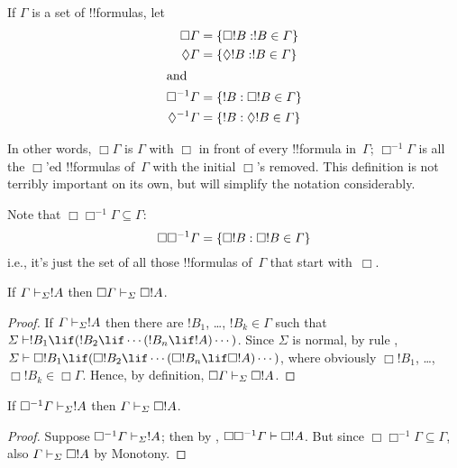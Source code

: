 \documentclass[../../../include/open-logic-section]{subfiles}
\begin{document}
\begin{defn}
  If $\Gamma$ is a set of !!{formula}s, let
  \begin{align*}
    \Box\Gamma & = \Setabs{\Box !B}{!B \in \Gamma}\\
    \Diamond\Gamma & = \Setabs{\Diamond !B}{!B \in \Gamma}\\
    \intertext{and}
    \Box^{-1}\Gamma & = \Setabs{!B}{\Box !B \in \Gamma}\\
    \Diamond^{-1}\Gamma & = \Setabs{!B}{\Diamond !B \in \Gamma}\\
  \end{align*}
\end{defn}

In other words, $\Box\Gamma$ is $\Gamma$ with $\Box$ in front of every
!!{formula} in~$\Gamma$; $\Box^{-1}\Gamma$ is all the $\Box$'ed
!!{formula}s of~$\Gamma$ with the initial $\Box$'s removed.  This
definition is not terribly important on its own, but will simplify the
notation considerably.

Note that $\Box\Box^{-1}\Gamma \subseteq \Gamma$:
\[
\Box\Box^{-1}\Gamma = \{ \Box!B : \Box!B \in \Gamma \}
\]
i.e., it's just the set of all those !!{formula}s of~$\Gamma$ that
start with~$\Box$.

\begin{lem}
  If $\Gamma \Proves[\Sigma] !A$ then $\Box\Gamma \Proves[\Sigma] \Box
  !A$.
\end{lem}

\begin{proof}
  If $\Gamma \Proves[\Sigma] !A$ then there are $!B_1$, \dots, $!B_k
  \in \Gamma$ such that $\Sigma \Proves !B_1 \lif (!B_2 \lif \cdots
  (!B_n \lif !A)\cdots)$. Since $\Sigma$ is normal, by rule \RK{},
  $\Sigma \Proves \Box!B_1 \lif (\Box!B_2 \lif \cdots (\Box!B_n \lif
  \Box!A)\cdots)$, where obviously $\Box!B_1$, \dots, $\Box!B_k \in
  \Box\Gamma$. Hence, by definition, $\Box\Gamma \Proves[\Sigma] \Box
  !A$.
\end{proof}

\begin{lem}
  If $\Box^{-1} \Gamma \Proves[\Sigma] !A$ then $\Gamma
  \Proves[\Sigma] \Box!A$.
\end{lem}

\begin{proof}
  Suppose $\Box^{-1}\Gamma \Proves[\Sigma] !A$; then by
  , $\Box\Box^{-1}\Gamma \Proves \Box!A$. But since
  $\Box\Box^{-1}\Gamma \subseteq \Gamma$, also $\Gamma \Proves[\Sigma]
  \Box!A$ by Monotony.
\end{proof}
\end{document}
